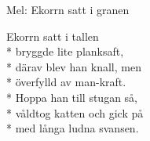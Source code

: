 \begin{SongText}
    \begin{SongInfo}
        Mel: Ekorrn satt i granen
    \end{SongInfo}
    \begin{SongVerse}
        Ekorrn satt i tallen\\*%
        bryggde lite planksaft,\\*%
        därav blev han knall, men\\*%
        överfylld av man-kraft.\\*%
        Hoppa han till stugan så, \\*%
        våldtog katten och gick på\\*%
        med långa ludna svansen.
    \end{SongVerse}
\end{SongText}

